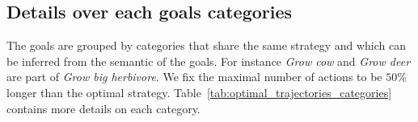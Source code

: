 
\subsection{Details over each goals categories} \label{app:details_goal_categories}

The goals are grouped by categories that share the same strategy and which can be inferred from the semantic of the goals. For instance \textit{Grow cow} and \textit{Grow deer} are part of \textit{Grow big herbivore}. We fix the maximal number of actions to be $50\%$ longer than the optimal strategy. Table~\ref{tab:optimal_trajectories_categories} contains more details on each category.


